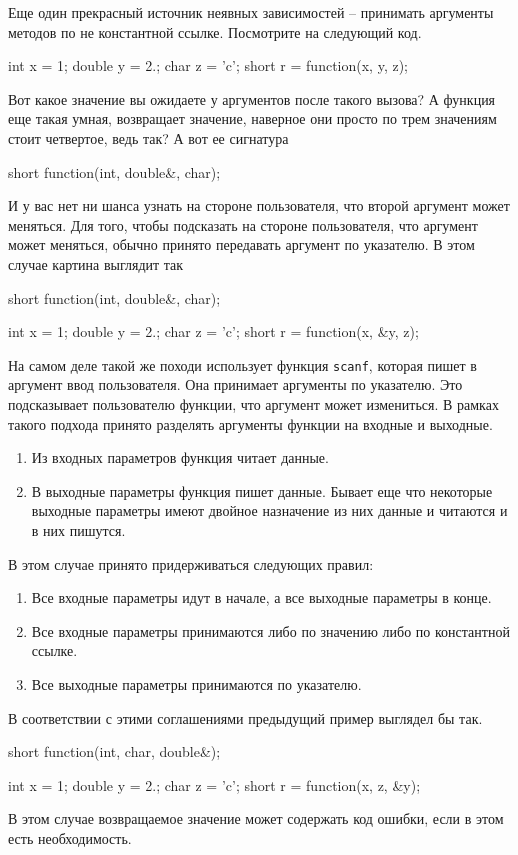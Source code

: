 Еще один прекрасный источник неявных зависимостей -- принимать аргументы методов по не константной ссылке.
Посмотрите на следующий код.
\begin{cppcode}
int x = 1;
double y = 2.;
char z = 'c';
short r = function(x, y, z);
\end{cppcode}
Вот какое значение вы ожидаете у аргументов после такого вызова?
А функция еще такая умная, возвращает значение, наверное они просто по трем значениям стоит четвертое, ведь так?
А вот ее сигнатура
\begin{cppcode}
short function(int, double&, char);
\end{cppcode}
И у вас нет ни шанса узнать на стороне пользователя, что второй аргумент может меняться.
Для того, чтобы подсказать на стороне пользователя, что аргумент может меняться, обычно принято передавать аргумент по указателю.
В этом случае картина выглядит так
\begin{cppcode}
short function(int, double&, char);

int x = 1;
double y = 2.;
char z = 'c';
short r = function(x, &y, z);
\end{cppcode}
На самом деле такой же походи использует функция \verb"scanf", которая пишет в аргумент ввод пользователя.
Она принимает аргументы по указателю.
Это подсказывает пользователю функции, что аргумент может измениться.
В рамках такого подхода принято разделять аргументы функции на входные и выходные.
\begin{enumerate}
\item Из входных параметров функция читает данные.

\item В выходные параметры функция пишет данные.
Бывает еще что некоторые выходные параметры имеют двойное назначение из них данные и читаются и в них пишутся.
\end{enumerate}
В этом случае принято придерживаться следующих правил:
\begin{enumerate}
\item Все входные параметры идут в начале, а все выходные параметры в конце.

\item Все входные параметры принимаются либо по значению либо по константной ссылке.

\item Все выходные параметры принимаются по указателю.
\end{enumerate}
В соответствии с этими соглашениями предыдущий пример выглядел бы так.
\begin{cppcode}
short function(int, char, double&);

int x = 1;
double y = 2.;
char z = 'c';
short r = function(x, z, &y);
\end{cppcode}
В этом случае возвращаемое значение может содержать код ошибки, если в этом есть необходимость.

